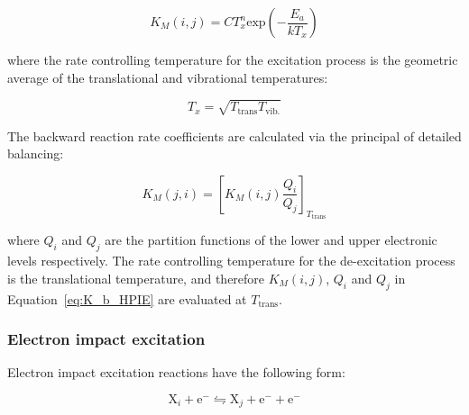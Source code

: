 \begin{equation}
 K_{M}(i,j) = C T_x^n \text{exp} \left ( - \frac{E_a}{k T_x} \right ) \label{eq:CR_GA}
\end{equation}

\noindent where the rate controlling temperature for the excitation process is the geometric average of the translational and vibrational temperatures:

\begin{equation}
 T_x = \sqrt{T_\text{trans} T_\text{vib.}}
\end{equation}

The backward reaction rate coefficients are calculated via the principal of detailed balancing:

\begin{equation}
 K_{M}(j,i) = \left [ K_{M}(i,j) \frac{Q_i}{Q_j} \right ]_{T_\text{trans}} \label{eq:K_b_HPIE}
\end{equation}

\noindent where $Q_i$ and $Q_j$ are the partition functions of the lower and upper electronic levels respectively.
The rate controlling temperature for the de-excitation process is the translational temperature, and therefore $K_{M}(i,j)$, $Q_i$ and $Q_j$ in Equation~\ref{eq:K_b_HPIE} are evaluated at $T_\text{trans}$. 


\subsubsection{Electron impact excitation}

Electron impact excitation reactions have the following form:

\begin{equation}
 \text{X}_i + \text{e}^- \leftrightharpoons  \text{X}_j + \text{e}^- + \text{e}^-
\end{equation}

